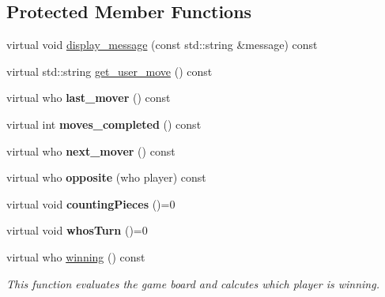 \subsection*{Protected Member Functions}
\begin{DoxyCompactItemize}
\item 
virtual void \mbox{\hyperlink{classmain__savitch__14_1_1game_ac58bfc07db8e604b07d2039b2cf7ab51}{display\+\_\+message}} (const std\+::string \&message) const
\item 
virtual std\+::string \mbox{\hyperlink{classmain__savitch__14_1_1game_a6504d401fcc8b138ae6342c2868c8a40}{get\+\_\+user\+\_\+move}} () const
\item 
\mbox{\label{classmain__savitch__14_1_1game_a5c1ab8b36fb977bbe9fe387e793e4ee5}} 
virtual who {\bfseries last\+\_\+mover} () const
\item 
\mbox{\label{classmain__savitch__14_1_1game_a31dd5382cc6d64a6d58bcee55383cf1b}} 
virtual int {\bfseries moves\+\_\+completed} () const
\item 
\mbox{\label{classmain__savitch__14_1_1game_a4e68409618474d19742dd5f75f92f5c9}} 
virtual who {\bfseries next\+\_\+mover} () const
\item 
\mbox{\label{classmain__savitch__14_1_1game_a98469e89e13c73a5ee70407a2164888c}} 
virtual who {\bfseries opposite} (who player) const
\item 
\mbox{\label{classmain__savitch__14_1_1game_a5954eccb6abf1ae900ad853ad2af99fa}} 
virtual void {\bfseries counting\+Pieces} ()=0
\item 
\mbox{\label{classmain__savitch__14_1_1game_a98190a2bf784ce0f20533475754d136d}} 
virtual void {\bfseries whos\+Turn} ()=0
\item 
virtual who \mbox{\hyperlink{classmain__savitch__14_1_1game_a2f0d5338c12bd98d52fe2383ece5c45e}{winning}} () const
\begin{DoxyCompactList}\small\item\em This function evaluates the game board and calcutes which player is winning. \end{DoxyCompactList}\item 

\end{DoxyCompactItemize}
